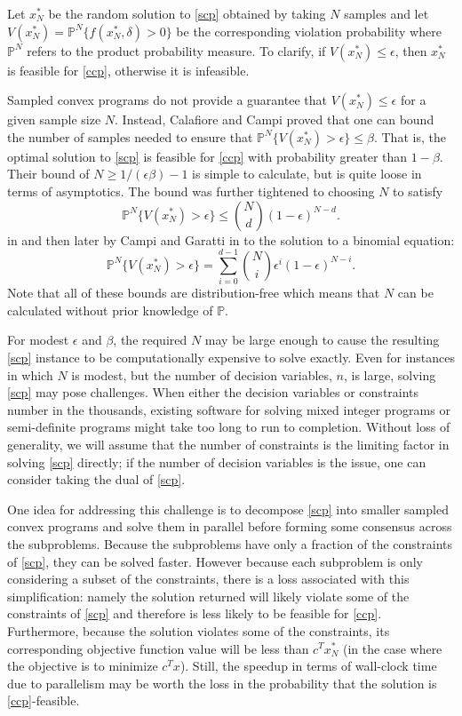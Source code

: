 \documentclass[12pt]{article}
\begin{document}
Let $x_N^*$ be the random solution to \ref{scp} obtained by taking $N$ samples and let $V(x_N^*) = \mathbb{P}^N\{f(x_N^*, \delta) > 0\}$ be the corresponding violation probability where $\mathbb{P}^N$ refers to the product probability measure.
To clarify, if $V(x_N^*) \leq \epsilon$, then $x_N^*$ is feasible for \ref{ccp}, otherwise it is infeasible.

Sampled convex programs do not provide a guarantee that $V(x_N^*) \leq \epsilon$ for a given sample size $N$.
Instead, Calafiore and Campi \cite{campi05} proved that one can bound the number of samples needed to ensure that $\mathbb{P}^N\{V(x_N^*) > \epsilon\} \leq \beta$.
That is, the optimal solution to \ref{scp} is feasible for \ref{ccp} with probability greater than $1 - \beta$.
Their bound of $N \geq 1/(\epsilon\beta) - 1$ is simple to calculate, but is quite loose in terms of asymptotics.
The bound was further tightened to choosing $N$ to satisfy
\[ \mathbb{P}^N\{V(x_N^*) > \epsilon\} \leq \binom{N}{d}(1-\epsilon)^{N-d}. \]
in \cite{campi06} and then later by Campi and Garatti in \cite{campi08} to the solution to a binomial equation:
\[ \mathbb{P}^N\{V(x_N^*) > \epsilon\} = \sum_{i=0}^{d-1} \binom{N}{i} \epsilon^i (1-\epsilon)^{N-i}. \]
Note that all of these bounds are distribution-free which means that $N$ can be calculated without prior knowledge of $\mathbb{P}$.

For modest $\epsilon$ and $\beta$, the required $N$ may be large enough to cause the resulting \ref{scp} instance to be computationally expensive to solve exactly.
Even for instances in which $N$ is modest, but the number of decision variables, $n$, is large, solving \ref{scp} may pose challenges.
When either the decision variables or constraints number in the thousands, existing software for solving mixed integer programs or semi-definite programs might take too long to run to completion.
Without loss of generality, we will assume that the number of constraints is the limiting factor in solving \ref{scp} directly; if the number of decision variables is the issue, one can consider taking the dual of \ref{scp}.

One idea for addressing this challenge is to decompose \ref{scp} into smaller sampled convex programs and solve them in parallel before forming some consensus across the subproblems.
Because the subproblems have only a fraction of the constraints of \ref{scp}, they can be solved faster.
However because each subproblem is only considering a subset of the constraints, there is a loss associated with this simplification: namely the solution returned will likely violate some of the constraints of \ref{scp} and therefore is less likely to be feasible for \ref{ccp}.
Furthermore, because the solution violates some of the constraints, its corresponding objective function value will be less than $c^T x_N^*$ (in the case where the objective is to minimize $c^T x$).
Still, the speedup in terms of wall-clock time due to parallelism may be worth the loss in the probability that the solution is \ref{ccp}-feasible.
\end{document}
